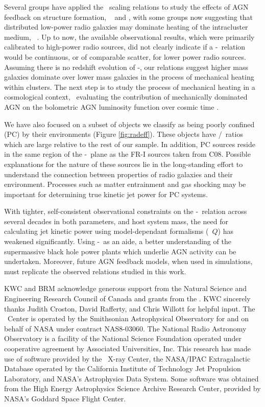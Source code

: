 \documentclass{emulateapj}
\begin{document}
Several groups have applied the \birzan\ scaling relations to study
the effects of AGN feedback on structure formation, \eg\
\citet{best07} and \citet{2007MNRAS.379..260M}, with some groups now
suggesting that distributed low-power radio galaxies may dominate
heating of the intracluster medium,
\eg\ \citet{2009arXiv0908.3158H}. Up to now, the available
observational results, which were primarily calibrated to high-power
radio sources, did not clearly indicate if a \pjet-\prad\ relation
would be continuous, or of comparable scatter, for lower power radio
sources. Assuming there is no redshift evolution of \pjet-\prad, our
relations suggest higher mass galaxies dominate over lower mass
galaxies in the process of mechanical heating within clusters. The
next step is to study the process of mechanical heating in a
cosmological context, \eg\ evaluating the contribution of mechanically
dominated AGN on the bolometric AGN luminosity function over cosmic
time \citet{2009MNRAS.395..518C}.

We have also focused on a subset of objects we classify as being
poorly confined (PC) by their environments (Figure
\ref{fig:radeff}). These objects have \pjet/\prad\ ratios which are
large relative to the rest of our sample. In addition, PC sources
reside in the same region of the \pjet-\prad\ plane as the FR-I
sources taken from C08. Possible explanations for the nature of these
sources lie in the long-standing effort to understand the connection
between properties of radio galaxies and their environment. Processes
such as matter entrainment and gas shocking may be important for
determining true kinetic jet power for PC systems.

With tighter, self-consistent observational constraints on the
\pjet-\prad\ relation across several decades in both parameters, and
host system mass, the need for calculating jet kinetic power using
model-dependant formalisms (\ie\ $Q$) has weakened
significantly. Using \pjet-\prad\ as an aide, a better understanding
of the supermassive black hole power plants which underlie AGN
activity can be undertaken. Moreover, future AGN feedback models, when
used in simulations, must replicate the observed relations studied in
this work.

\acknowledgements

KWC and BRM acknowledge generous support from the Natural Science and
Engineering Research Council of Canada and grants from the \cxo. KWC
sincerely thanks Judith Croston, David Rafferty, and Chris Willott for
helpful input. The \cxo\ Center is operated by the Smithsonian
Astrophysical Observatory for and on behalf of NASA under contract
NAS8-03060. The National Radio Astronomy Observatory is a facility of
the National Science Foundation operated under cooperative agreement
by Associated Universities, Inc. This research has made use of
software provided by the \chandra\ X-ray Center, the NASA/IPAC
Extragalactic Database operated by the California Institute of
Technology Jet Propulsion Laboratory, and NASA's Astrophysics Data
System. Some software was obtained from the High Energy Astrophysics
Science Archive Research Center, provided by NASA's Goddard Space
Flight Center.
\end{document}
